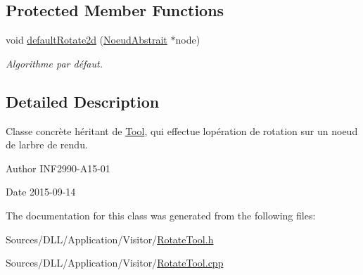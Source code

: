 \subsection*{Protected Member Functions}
\begin{DoxyCompactItemize}
\item 
\hypertarget{group__inf2990_ga3d7a6452fd82b9684e5e24ed3aeef6b5}{}void \hyperlink{group__inf2990_ga3d7a6452fd82b9684e5e24ed3aeef6b5}{default\+Rotate2d} (\hyperlink{class_noeud_abstrait}{Noeud\+Abstrait} $\ast$node)\label{group__inf2990_ga3d7a6452fd82b9684e5e24ed3aeef6b5}

\begin{DoxyCompactList}\small\item\em Algorithme par défaut. \end{DoxyCompactList}\end{DoxyCompactItemize}


\subsection{Detailed Description}
Classe concrète héritant de \hyperlink{class_tool}{Tool}, qui effectue l\textquotesingle{}opération de rotation sur un noeud de l\textquotesingle{}arbre de rendu. 

\begin{DoxyAuthor}{Author}
I\+N\+F2990-\/\+A15-\/01 
\end{DoxyAuthor}
\begin{DoxyDate}{Date}
2015-\/09-\/14 
\end{DoxyDate}


The documentation for this class was generated from the following files\+:\begin{DoxyCompactItemize}
\item 
Sources/\+D\+L\+L/\+Application/\+Visitor/\hyperlink{_rotate_tool_8h}{Rotate\+Tool.\+h}\item 
Sources/\+D\+L\+L/\+Application/\+Visitor/\hyperlink{_rotate_tool_8cpp}{Rotate\+Tool.\+cpp}\end{DoxyCompactItemize}
